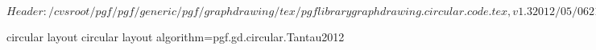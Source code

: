 %
%
%

\ProvidesFileRCS[v\pgfversion] $Header: /cvsroot/pgf/pgf/generic/pgf/graphdrawing/tex/pgflibrarygraphdrawing.circular.code.tex,v 1.3 2012/05/06 21:45:47 tantau Exp $





%
%
\pgfgddeclarealgorithmkey
  {circular layout}
  {circular layout}
  {algorithm=pgf.gd.circular.Tantau2012}



\endinput